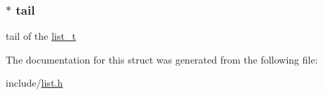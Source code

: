 \subsubsection[{\texorpdfstring{tail}{tail}}]{$\ast$ tail}\hypertarget{structlist__t_aadd75bfd4f098ab0aa1e6aa547f35841}{}\label{structlist__t_aadd75bfd4f098ab0aa1e6aa547f35841}
tail of the \hyperlink{structlist__t}{list\+\_\+t} 

The documentation for this struct was generated from the following file\+:\begin{DoxyCompactItemize}
\item 
include/\hyperlink{list_8h}{list.\+h}\end{DoxyCompactItemize}

